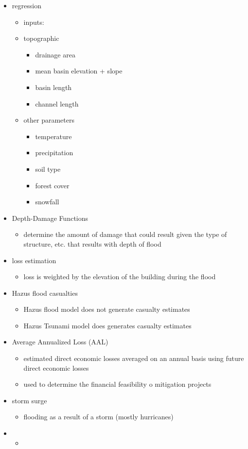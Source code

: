 \documentclass[11pt ,twoside, a4paper]{article}
\begin{document}
\begin{itemize}
	\item regression
	\begin{itemize}
		\item inputs:
		\item topographic
		\begin{itemize}
			\item drainage area
			\item mean basin elevation + slope
			\item basin length
			\item channel length
		\end{itemize}
		\item other parameters
		\begin{itemize}
			\item temperature
			\item precipitation
			\item soil type
			\item forest cover
			\item snowfall
		\end{itemize}
	\end{itemize}
	
	\item Depth-Damage Functions
	\begin{itemize}
		\item determine the amount of damage that could result given the type of structure, etc. that results with depth of flood
	\end{itemize}
	
	\item loss estimation 
	\begin{itemize}
		\item loss is weighted by the elevation of the building during the flood
	\end{itemize}
	
	\item Hazus flood casualties
	\begin{itemize}
		\item Hazus flood model does not generate casualty estimates
		\item Hazus Tsunami model does generates casualty estimates
	\end{itemize}
	
	\item Average Annualized Loss (AAL)
	\begin{itemize}
		\item estimated direct economic losses averaged on an annual basis using future direct economic losses
		\item used to determine the financial feasibility o mitigation projects
	\end{itemize}
	
	\item storm surge
	\begin{itemize}
		\item flooding as a result of a storm (mostly hurricanes)
	\end{itemize}

	\item 
	\begin{itemize}
		\item 
	\end{itemize}


\end{itemize}
\end{document}
